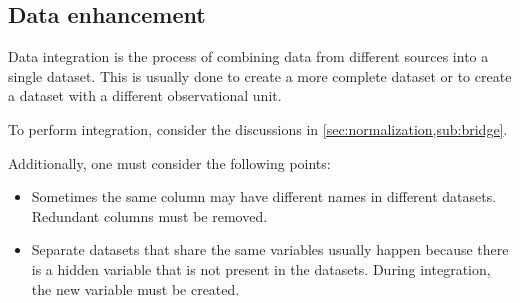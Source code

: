 

\subsection{Data enhancement}

Data integration is the process of combining data from different sources into a single
dataset.  This is usually done to create a more complete dataset or to create a dataset
with a different observational unit.

To perform integration, consider the discussions in \cref{sec:normalization,sub:bridge}.

Additionally, one must consider the following points:
\begin{itemize}
  \item Sometimes the same column may have different names in different datasets.  Redundant
    columns must be removed.
  \item Separate datasets that share the same variables usually happen because there is a
    hidden variable that is not present in the datasets.  During integration, the new
    variable must be created.
\end{itemize}


